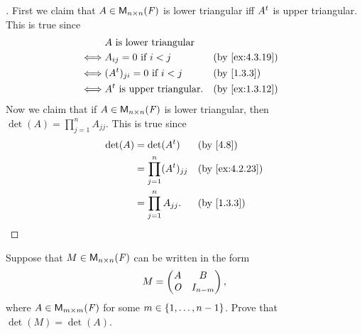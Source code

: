 \begin{proof}[]
  First we claim that \(A \in \mathsf{M}_{{n} \times n}({\mathit{F}})\) is lower triangular iff \({A}^{t}\) is upper triangular.
  This is true since
  \begin{align*}
         & A \text{ is lower triangular}                                          \\
    \iff & A_{i j} = 0 \text{ if } i < j        &  & \text{(by \cref{ex:4.3.19})} \\
    \iff & (\tp{A})_{j i} = 0 \text{ if } i < j &  & \text{(by \cref{1.3.3})}     \\
    \iff & \tp{A} \text{ is upper triangular}.  &  & \text{(by \cref{ex:1.3.12})}
  \end{align*}
  Now we claim that if \(A \in \mathsf{M}_{{n} \times n}({\mathit{F}})\) is lower triangular, then \(\det(A) = \prod_{j = 1}^n A_{j j}\).
  This is true since
  \begin{align*}
    \det(A) & = \det(\tp{A})                   &  & \text{(by \cref{4.8})}       \\
            & = \prod_{j = 1}^n (\tp{A})_{j j} &  & \text{(by \cref{ex:4.2.23})} \\
            & = \prod_{j = 1}^n A_{j j}.       &  & \text{(by \cref{1.3.3})}
  \end{align*}
\end{proof}

\begin{ex}\label{ex:4.3.20}
  Suppose that \(M \in \mathsf{M}_{{n} \times n}({\mathit{F}})\) can be written in the form
  \[
    M = \begin{pmatrix}
      A   & B         \\
      \mathit{O} & I_{n - m}
    \end{pmatrix},
  \]
  where \(A \in \mathsf{M}_{{m} \times m}({\mathit{F}})\) for some \(m \in \left\lbrace1, \dots, n - 1\right\rbrace\).
  Prove that \(\det(M) = \det(A)\).
\end{ex}

